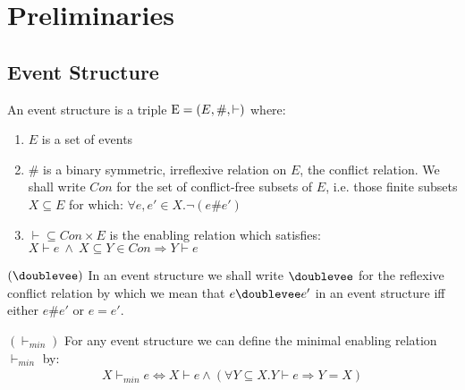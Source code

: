 \section{Preliminaries}
\subsection{Event Structure \cite{es}}
\begin{definition}
    An event structure is a triple $\mathrm{E} = (E,\#,\vdash)$ where:
    \begin{enumerate}
        \item $E$ is a set of events
        \item \# is a binary symmetric, irreflexive relation on $E$,
              the conflict relation.
              We shall write $Con$ for the set of conflict-free subsets of $E$,
              i.e. those finite subsets $X \subseteq E$ for which:
              $\forall e,e' \in X . \neg (e\#e')$
        \item $\vdash \subseteq Con \times E$ is the enabling relation which satisfies:
              $ X \vdash e \ \wedge \ X \subseteq Y \in Con \Rightarrow Y \vdash e$
    \end{enumerate}

\end{definition}
\begin{notion}{$(\doublevee)$}
    In an event structure we shall write $\doublevee$ for the reflexive conflict relation by which we mean
    that $e\doublevee e'$ in an event structure iff either $e\#e'$ or $e=e'$.
\end{notion}

\begin{notion}{$(\vdash_{min})$}
    For any event structure we can define the minimal enabling relation $\vdash_{min}$ by:
    \begin{align*}
        X \vdash_{min} e \iff X \vdash e \wedge
        ( \forall Y \subseteq X . Y \vdash e \Rightarrow Y = X )
    \end{align*}
\end{notion}

